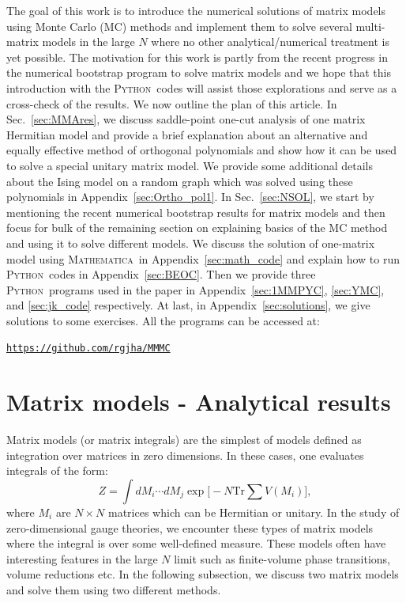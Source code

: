 \documentclass[letter,11pt]{article}
\newcommand{\MA}{\textsc{Mathematica}}
\newcommand{\PY}{\textsc{Python}}
\begin{document}
The goal of this work is to introduce the numerical solutions of matrix models using Monte Carlo (MC) methods and implement them to solve several multi-matrix 
models in the large $N$ where no other analytical/numerical treatment is yet possible. The motivation for this work is partly from the recent progress in the numerical bootstrap program to solve matrix models and we hope that this introduction with the \PY~codes will assist those explorations and serve as a cross-check of the results. We now outline the plan of this article. In Sec.~\ref{sec:MMAres}, we discuss saddle-point one-cut analysis of one matrix Hermitian model and provide a brief explanation about an alternative and equally effective method of orthogonal polynomials and show how it can be used to 
solve a special unitary matrix model. We provide some additional details about the Ising model on a random graph which was solved using these polynomials in Appendix~\ref{sec:Ortho_pol1}. In Sec.~\ref{sec:NSOL}, we start by mentioning the recent numerical bootstrap results for matrix models and then focus for bulk of the remaining section on explaining basics of the MC method and using it to solve different models. We discuss the solution of one-matrix model using \MA~in  Appendix~\ref{sec:math_code} and explain how to run \PY~codes in Appendix~\ref{sec:BEOC}. Then  we provide three  \PY~programs used in the paper in Appendix~\ref{sec:1MMPYC}, \ref{sec:YMC}, and \ref{sec:jk_code} respectively. At last, in Appendix~\ref{sec:solutions}, we give solutions to some exercises. All the programs can be accessed at:  
\begin{center} \texttt{\href{https://github.com/rgjha/MMMC}{https://github.com/rgjha/MMMC}} \end{center}

\section{\label{sec:MMAres}Matrix models - Analytical results} 
Matrix models (or matrix integrals) are the simplest of models 
defined as integration over matrices in zero dimensions. 
In these cases, one evaluates integrals of the form:
\begin{equation}
Z = \int dM_{i} \cdots dM_{j} \exp\Bigg[-N \mathrm{Tr} \sum V(M_{i})\Bigg] ,
\end{equation}
where $M_{i}$ are $N \times N$ matrices which can be Hermitian or unitary.  
In the study of zero-dimensional gauge theories, we encounter these types of matrix models where the integral is over some well-defined measure. These models often have interesting features in the large $N$ limit such as finite-volume phase transitions, volume reductions etc. In the following subsection, we discuss two matrix models and solve them using two different methods. 
\end{document}
